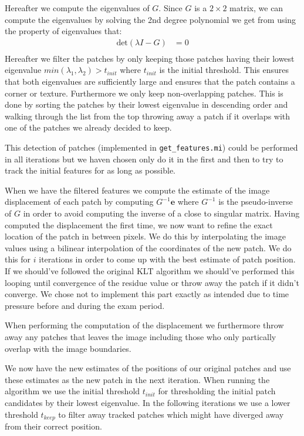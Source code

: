 \documentclass[11pt,a4paper]{article}
\begin{document}
Hereafter we compute the eigenvalues of $G$. Since $G$ is a $2 \times 2$ matrix,
we can compute the eigenvalues by solving the 2nd degree polynomial we
get from using the property of eigenvalues that:
\begin{align*}
    \text{det}\left( \lambda I - G\right) &= 0 \\
\end{align*}
Hereafter we filter the patches by only keeping those patches having their
lowest eigenvalue $min(\lambda_1,\lambda_2) > t_{init}$ where $t_{init}$ is the
initial threshold. This ensures that both eigenvalues are
sufficiently large and ensures that the patch contains a corner or texture.
Furthermore we only keep non-overlapping patches. This is done by sorting the patches by their
lowest eigenvalue in descending order and walking through the list from the top
throwing away a patch if it overlaps with one of the patches we already decided
to keep.

This detection of patches (implemented in \texttt{get\_features.mi}) could be
performed in all iterations but we haven chosen only do it in the first and then to
try to track the initial features for as long as possible.

When we have the filtered features we compute the estimate of the image
displacement of each patch by computing $G^{-1} \boldsymbol{e}$ where $G^{-1}$
is the pseudo-inverse of $G$ in order to avoid computing the inverse of a close
to singular matrix.
Having computed the displacement the first time, we now want to refine the exact
location of the patch in between pixels. We do this by interpolating the image
values using a bilinear interpolation of the coordinates of the new patch. We
do this for $i$ iterations in order to come up with the best estimate of patch
position. If we should've followed the original KLT algorithm we should've
performed this looping until convergence of the residue value or throw away the
patch if it didn't converge. We chose not to implement this part exactly as
intended due to time pressure before and during the exam period.

When performing the computation of the displacement we furthermore throw away
any patches that leaves the image including those who only partically overlap
with the image boundaries.

We now have the new estimates of the positions of our original patches and use
these estimates as the new patch in the next iteration. When running the
algorithm we use the initial threshold $t_{init}$ for thresholding the initial
patch candidates by their lowest eigenvalue. In the following iterations we use
a lower threshold $t_{keep}$ to filter away tracked patches which might have
diverged away from their correct position.
%
\end{document}

